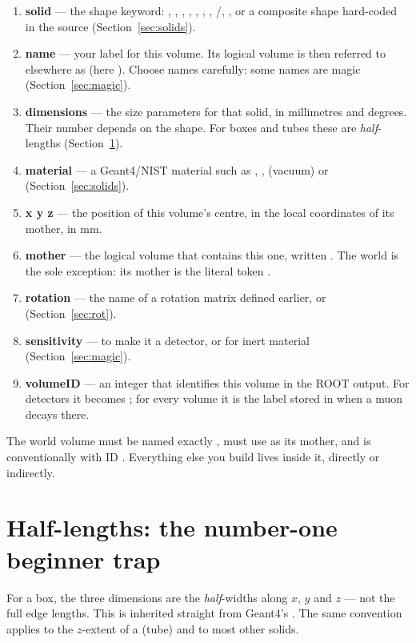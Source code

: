 \begin{enumerate}[label=\textbf{(\arabic*)}]
  \item \textbf{solid} --- the shape keyword: , , , , , , , /, , or a composite shape hard-coded in the source (Section~\ref{sec:solids}).
  \item \textbf{name} --- your label for this volume. Its logical volume is then referred to elsewhere as  (here ). Choose names carefully: some names are magic (Section~\ref{sec:magic}).
  \item \textbf{dimensions} --- the size parameters for that solid, in millimetres and degrees. Their number depends on the shape. For boxes and tubes these are \emph{half}-lengths (Section~\ref{sec:half}).
  \item \textbf{material} --- a Geant4/NIST material such as , ,  (vacuum) or  (Section~\ref{sec:solids}).
  \item \textbf{x y z} --- the position of this volume's centre, in the local coordinates of its mother, in mm.
  \item \textbf{mother} --- the logical volume that contains this one, written . The world is the sole exception: its mother is the literal token .
  \item \textbf{rotation} --- the name of a rotation matrix defined earlier, or  (Section~\ref{sec:rot}).
  \item \textbf{sensitivity} ---  to make it a detector, or  for inert material (Section~\ref{sec:magic}).
  \item \textbf{volumeID} --- an integer that identifies this volume in the ROOT output. For detectors it becomes ; for every volume it is the label stored in  when a muon decays there.
\end{enumerate}

\begin{keypoint}
The world volume must be named exactly , must use  as its mother, and is conventionally  with ID . Everything else you build lives inside it, directly or indirectly.
\end{keypoint}

\section{Half-lengths: the number-one beginner trap}
\label{sec:half}
For a box, the three dimensions are the \emph{half}-widths along \(x\), \(y\) and \(z\) --- not the full edge lengths. This is inherited straight from Geant4's . The same convention applies to the \(z\)-extent of a  (tube) and to most other solids.

